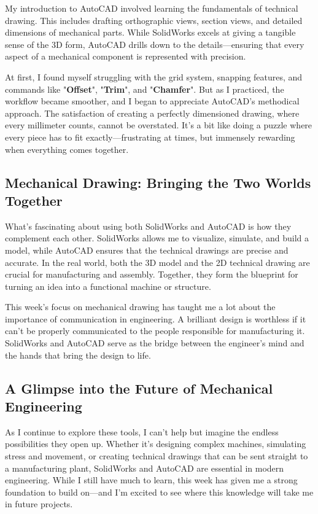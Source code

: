 \documentclass[a4paper]{article} 	%
\begin{document}
My introduction to AutoCAD involved learning the fundamentals of technical drawing. This includes drafting orthographic views, section views, and detailed dimensions of mechanical parts. While SolidWorks excels at giving a tangible sense of the 3D form, AutoCAD drills down to the details—ensuring that every aspect of a mechanical component is represented with precision.

At first, I found myself struggling with the grid system, snapping features, and commands like "\textbf{Offset}", "\textbf{Trim}", and "\textbf{Chamfer}". But as I practiced, the workflow became smoother, and I began to appreciate AutoCAD’s methodical approach. The satisfaction of creating a perfectly dimensioned drawing, where every millimeter counts, cannot be overstated. It’s a bit like doing a puzzle where every piece has to fit exactly—frustrating at times, but immensely rewarding when everything comes together.

\subsection*{Mechanical Drawing: Bringing the Two Worlds Together}

What’s fascinating about using both SolidWorks and AutoCAD is how they complement each other. SolidWorks allows me to visualize, simulate, and build a model, while AutoCAD ensures that the technical drawings are precise and accurate. In the real world, both the 3D model and the 2D technical drawing are crucial for manufacturing and assembly. Together, they form the blueprint for turning an idea into a functional machine or structure.

This week’s focus on mechanical drawing has taught me a lot about the importance of communication in engineering. A brilliant design is worthless if it can’t be properly communicated to the people responsible for manufacturing it. SolidWorks and AutoCAD serve as the bridge between the engineer’s mind and the hands that bring the design to life.

\subsection*{A Glimpse into the Future of Mechanical Engineering}

As I continue to explore these tools, I can’t help but imagine the endless possibilities they open up. Whether it’s designing complex machines, simulating stress and movement, or creating technical drawings that can be sent straight to a manufacturing plant, SolidWorks and AutoCAD are essential in modern engineering. While I still have much to learn, this week has given me a strong foundation to build on—and I’m excited to see where this knowledge will take me in future projects.
\end{document}
